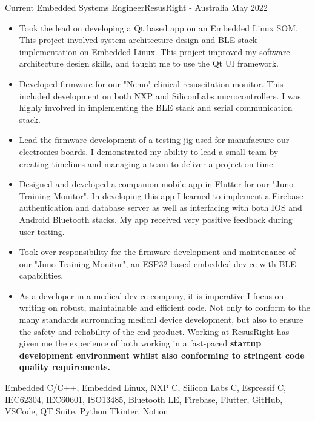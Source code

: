 %
%
%
\begin{experiences}
	\experience
	{Current}	{Embedded Systems Engineer}{ResusRight - Australia}
	{May 2022}	{
		\begin{itemize}
			\item Took the lead on developing a Qt based app on an Embedded Linux SOM. This project involved system architecture design and BLE stack implementation on Embedded Linux. This project improved my software architecture design skills, and taught me to use the Qt UI framework.
			\item Developed firmware for our "Nemo" clinical resuscitation monitor. This included development on both NXP and SiliconLabs microcontrollers. I was highly involved in implementing the BLE stack and serial communication stack.
			\item Lead the firmware development of a testing jig used for manufacture our electronics boards. I demonstrated my ability to lead a small team by creating timelines and managing a team to deliver a project on time.
			\item Designed and developed a companion mobile app in Flutter for our "Juno Training Monitor". In developing this app I learned to implement a Firebase authentication and database server as well as interfacing with both IOS and Android Bluetooth stacks. My app received very positive feedback during user testing.
			\item Took over responsibility for the firmware development and maintenance of our "Juno Training Monitor", an ESP32 based embedded device with BLE capabilities. 
			\item As a developer in a medical device company, it is imperative I focus on writing on robust, maintainable and efficient code. Not only to conform to the many standards surrounding medical device development, but also to ensure the safety and reliability of the end product. Working at ResusRight has given me the experience of both working in a fast-paced \bf{startup} development environment whilst also conforming to stringent code quality requirements.
		\end{itemize}
	}
	{Embedded C/C++, Embedded Linux, NXP \mu C, Silicon Labs \mu C, Espressif \mu C, IEC62304, IEC60601, ISO13485, Bluetooth LE, Firebase, Flutter, GitHub, VSCode, QT Suite, Python Tkinter, Notion}

\end{experiences}
